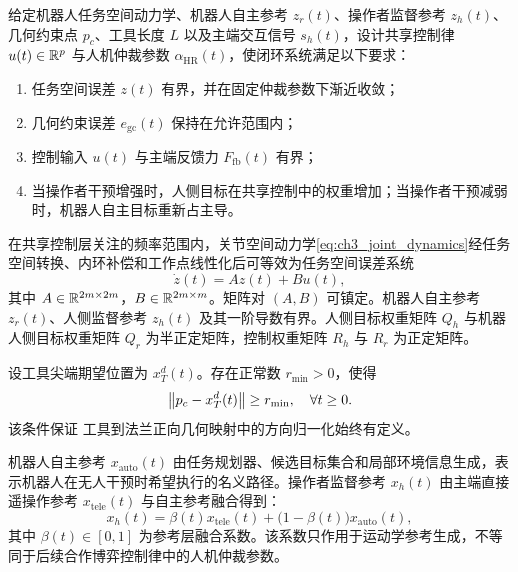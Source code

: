 \begin{problem}[刚性几何约束下的人机监督共享控制问题]
\label{prob:ch3_shared_control}
给定机器人任务空间动力学、机器人自主参考 $z_r(t)$、操作者监督参考 $z_h(t)$、几何约束点 $p_c$、工具长度 $L$ 以及主端交互信号 $s_h(t)$，设计共享控制律 $u(t)\in\mathbb{R}^p$ 与人机仲裁参数 $\alpha_{\mathrm{HR}}(t)$，使闭环系统满足以下要求：
\begin{enumerate}[label=(\arabic*)]
  \item 任务空间误差 $z(t)$ 有界，并在固定仲裁参数下渐近收敛；
  \item 几何约束误差 $e_{\mathrm{gc}}(t)$ 保持在允许范围内；
  \item 控制输入 $u(t)$ 与主端反馈力 $F_{\mathrm{fb}}(t)$ 有界；
  \item 当操作者干预增强时，人侧目标在共享控制中的权重增加；当操作者干预减弱时，机器人自主目标重新占主导。
\end{enumerate}
\end{problem}

\begin{assumption}[任务空间动力学与参考信号]
\label{ass:ch3_dynamics}
在共享控制层关注的频率范围内，关节空间动力学\eqref{eq:ch3_joint_dynamics}经任务空间转换、内环补偿和工作点线性化后可等效为任务空间误差系统
\begin{equation}
  \dot z(t)=Az(t)+Bu(t),
  \label{eq:ch3_linear_model}
\end{equation}
其中 $A\in\mathbb{R}^{2m\times 2m}$，$B\in\mathbb{R}^{2m\times m}$。矩阵对 $(A,B)$ 可镇定。机器人自主参考 $z_r(t)$、人侧监督参考 $z_h(t)$ 及其一阶导数有界。人侧目标权重矩阵 $Q_h$ 与机器人侧目标权重矩阵 $Q_r$ 为半正定矩阵，控制权重矩阵 $R_h$ 与 $R_r$ 为正定矩阵。
\end{assumption}

\begin{assumption}[几何约束映射非奇异性]
\label{ass:ch3_rcm_nonsingular}
设工具尖端期望位置为 $x_T^d(t)$。存在正常数 $r_{\min}>0$，使得
\begin{equation}
  \left\lVert p_c-x_T^d(t)\right\rVert\ge r_{\min},\quad \forall t\ge 0 .
  \label{eq:ch3_rcm_nonzero}
\end{equation}
该条件保证 工具到法兰正向几何映射中的方向归一化始终有定义。
\end{assumption}

\begin{definition}[人机监督参考与机器人自主参考]
\label{def:ch3_refs}
机器人自主参考 $x_{\mathrm{auto}}(t)$ 由任务规划器、候选目标集合和局部环境信息生成，表示机器人在无人干预时希望执行的名义路径。操作者监督参考 $x_h(t)$ 由主端直接遥操作参考 $x_{\mathrm{tele}}(t)$ 与自主参考融合得到：
\begin{equation}
  x_h(t)=\beta(t)x_{\mathrm{tele}}(t)+\bigl(1-\beta(t)\bigr)x_{\mathrm{auto}}(t),
  \label{eq:ch3_ref_blending}
\end{equation}
其中 $\beta(t)\in[0,1]$ 为参考层融合系数。该系数只作用于运动学参考生成，不等同于后续合作博弈控制律中的人机仲裁参数。
\end{definition}

